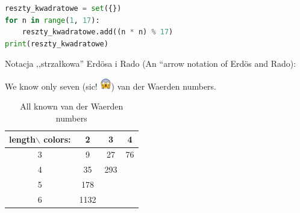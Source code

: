 \documentclass{beamer}
\begin{document}
\begin{frame}[fragile] %
  
\begin{lstlisting}[language=Python]
reszty_kwadratowe = set({})
for n in range(1, 17):
	reszty_kwadratowe.add((n * n) % 17)
print(reszty_kwadratowe)
\end{lstlisting}

\end{frame}

\begin{frame}
  \begin{block}{
    Notacja ,,strzałkowa'' Erd\"osa i Rado
    (An ``arrow notation of Erd\"os and Rado):}
  \end{block}
\end{frame}

\begin{frame}
  \begin{block}{
    We know only seven (sic! \includegraphics[height=5mm]{krzyczacy.jpeg})
    van der Waerden numbers.}
   \end{block}

\begin{table}
  \centering
  \begin{tabular}{| c | c c c |}
    \hline 
     length$\backslash$ colors: & 2 & 3 & 4 \\
    \hline
    3 & 9 & 27 & 76 \\
    \hline
    4 & 35 & 293 &  \\
    \hline
    5 & 178 &  &  \\
    \hline
    6 & 1132 & & \\
    \hline
    \end{tabular}
  \caption{All known van der Waerden numbers}
\end{table}
\end{frame}
\end{document}
